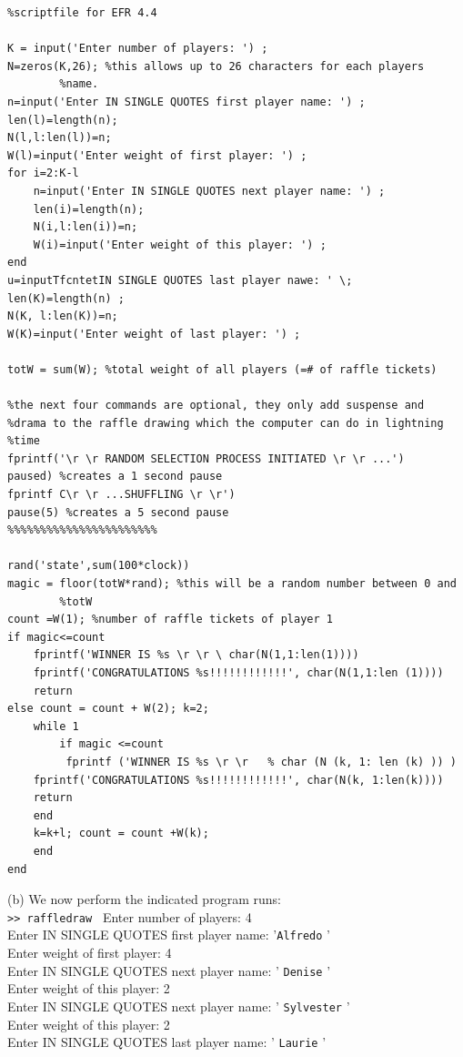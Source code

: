 \documentclass[../main.tex]{subfiles}
\begin{document}
\begin{lstlisting}[numbers=none]
%raffledraw.m 
%scriptfile for EFR 4.4 

K = input('Enter number of players: ') ; 
N=zeros(K,26); %this allows up to 26 characters for each players 
		%name. 
n=input('Enter IN SINGLE QUOTES first player name: ') ; 
len(l)=length(n); 
N(l,l:len(l))=n; 
W(l)=input('Enter weight of first player: ') ; 
for i=2:K-l 
	n=input('Enter IN SINGLE QUOTES next player name: ') ; 
	len(i)=length(n); 
	N(i,l:len(i))=n; 
	W(i)=input('Enter weight of this player: ') ; 
end 
u=inputTfcntetIN SINGLE QUOTES last player nawe: ' \; 
len(K)=length(n) ; 
N(K, l:len(K))=n; 
W(K)=input('Enter weight of last player: ') ;
 
totW = sum(W); %total weight of all players (=# of raffle tickets) 

%the next four commands are optional, they only add suspense and 
%drama to the raffle drawing which the computer can do in lightning 
%time 
fprintf('\r \r RANDOM SELECTION PROCESS INITIATED \r \r ...') 
paused) %creates a 1 second pause
fprintf C\r \r ...SHUFFLING \r \r') 
pause(5) %creates a 5 second pause 
%%%%%%%%%%%%%%%%%%%%%%% 

rand('state',sum(100*clock)) 
magic = floor(totW*rand); %this will be a random number between 0 and 
		%totW 
count =W(1); %number of raffle tickets of player 1 
if magic<=count 
	fprintf('WINNER IS %s \r \r \ char(N(1,1:len(1)))) 
	fprintf('CONGRATULATIONS %s!!!!!!!!!!!!', char(N(1,1:len (1)))) 
	return 
else count = count + W(2); k=2; 
	while 1 
		if magic <=count 
	 	 fprintf ('WINNER IS %s \r \r 	% char (N (k, 1: len (k) )) ) 
	fprintf('CONGRATULATIONS %s!!!!!!!!!!!!', char(N(k,	1:len(k)))) 
	return 
	end 
	k=k+l; count = count +W(k); 
	end 
end 	
\end{lstlisting}
(b) We now perform the indicated program runs: \\
\texttt{>> raffledraw }
Enter number of players: 4 \\
Enter IN SINGLE QUOTES first player name: '\texttt{Alfredo} ' \\
Enter weight of first player: 4 \\
Enter IN SINGLE QUOTES next player name: ' \texttt{Denise} ' \\
Enter weight of this player: 2 \\
Enter IN SINGLE QUOTES next player name: ' \texttt{Sylvester} ' \\
Enter weight of this player: 2 \\
Enter IN SINGLE QUOTES last player name: ' \texttt{Laurie} ' \\
\end{document}
